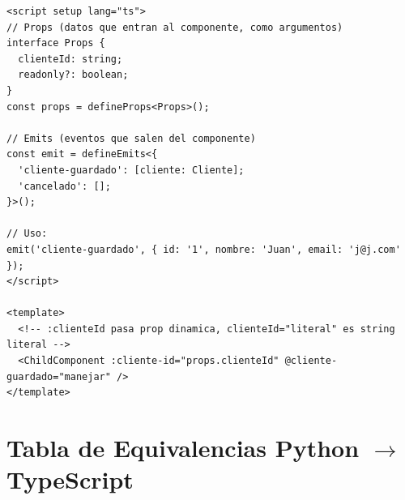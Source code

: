\documentclass[11pt,a4paper]{article}
\begin{document}
\begin{vuebox}
\begin{lstlisting}[style=typescript]
<script setup lang="ts">
// Props (datos que entran al componente, como argumentos)
interface Props {
  clienteId: string;
  readonly?: boolean;
}
const props = defineProps<Props>();

// Emits (eventos que salen del componente)
const emit = defineEmits<{
  'cliente-guardado': [cliente: Cliente];
  'cancelado': [];
}>();

// Uso:
emit('cliente-guardado', { id: '1', nombre: 'Juan', email: 'j@j.com' });
</script>

<template>
  <!-- :clienteId pasa prop dinamica, clienteId="literal" es string literal -->
  <ChildComponent :cliente-id="props.clienteId" @cliente-guardado="manejar" />
</template>
\end{lstlisting}
\end{vuebox}

\section{Tabla de Equivalencias Python $\to$ TypeScript}
\end{document}
